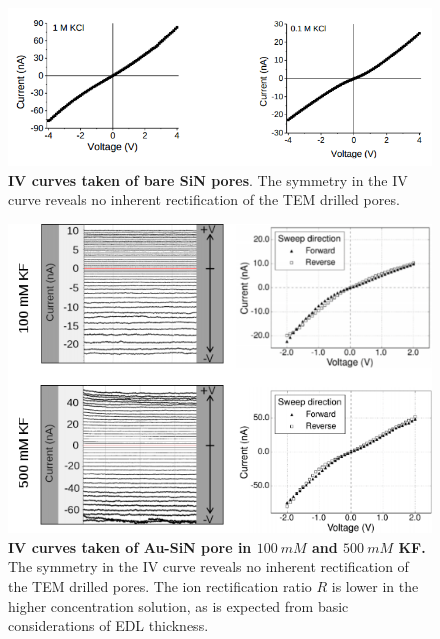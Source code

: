 		\begin{figure}
			\includegraphics[width=\textwidth]{sinsymm}
			\caption{\textbf{IV curves taken of bare SiN pores}. The symmetry in the IV curve reveals no inherent rectification of the TEM drilled pores.}
			\label{fig:sinsymm}
		\end{figure}
		
		\begin{figure}
			\includegraphics[width=\textwidth]{sinau0}
			\caption{\textbf{IV curves taken of Au-SiN pore in $\SI{100}{mM}$ and $\SI{500}{mM}$ KF.} The symmetry in the IV curve reveals no inherent rectification of the TEM drilled pores. The ion rectification ratio $R$ is lower in the higher concentration solution, as is expected from basic considerations of EDL thickness.}
			\label{fig:sinau0}
		\end{figure}
		
